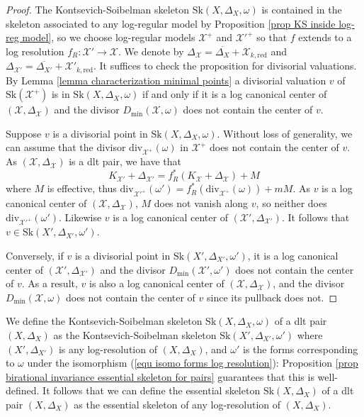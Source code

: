 \documentclass{amsart}%
\numberwithin{equation}{subsection}
\theoremstyle{plain2}
\theoremstyle{definition2}
\theoremstyle{stepstyle}
\theoremstyle{point}
\theoremstyle{subpoint}
\newcommand{\cX}{\ensuremath{\mathscr{X}}}
\newcommand{\redu}{\mathrm{red}}
\newcommand{\divisor}{\mathrm{div}}
\newcommand{\Sk}{\mathrm{Sk}}
\begin{document}
\begin{proof}
The Kontsevich-Soibelman skeleton $\Sk(X,\Delta_X,\omega)$ is contained in the skeleton associated to any log-regular model by Proposition \ref{prop KS inside log-reg model}, so we choose log-regular models $\cX^+$ and $\cX'^+$ so that $f$ extends to a log resolution $f_R \colon \cX' \to \cX$. We denote by $\Delta_\cX = \overline{\Delta_X} + \cX_{k,\redu}$ and $\Delta_{\cX'}=\overline{\Delta_{X'}} + \cX'_{k,\redu}$. It suffices to check the proposition for divisorial valuations. By Lemma \ref{lemma characterization minimal points} a divisorial valuation $v$ of $\Sk(\cX^+)$ is in $\Sk(X,\Delta_X,\omega)$ if and only if it is a log canonical center of $(\cX,\Delta_{\cX})$ and the divisor $D_{\min}(\cX,\omega)$ does not contain the center of $v$.  

Suppose $v$ is a divisorial point in $\Sk(X, \Delta_X,\omega)$. Without loss of generality, we can assume that the divisor $\divisor_{\cX^+}(\omega)$ in $\cX^+$ does not contain the center of $v$. As $(\cX, \Delta_\cX)$ is a dlt pair, we have that $$K_{\cX'}+\Delta_{\cX'}= f_R^*(K_{\cX}+\Delta_\cX)+M$$ where $M$ is effective, thus  $\divisor_{\cX'^+}(\omega')=f^*_R(\divisor_{\cX^+}(\omega))+mM$. As $v$ is a log canonical center of $(\cX,\Delta_\cX)$, $M$ does not vanish along $v$, so neither does $\divisor_{\cX'^+}(\omega')$. Likewise $v$ is a log canonical center of $(\cX', \Delta_{\cX'})$. It follows that $v \in \Sk(X',\Delta_{X'},\omega')$.

Conversely, if $v$ is a divisorial point in $\Sk(X', \Delta_{X'},\omega')$, it is a log canonical center of $(\cX', \Delta_{\cX'})$ and the divisor $D_{\min}(\cX',\omega')$ does not contain the center of $v$. As a result, $v$ is also a log canonical center of $(\cX, \Delta_\cX)$, and the divisor $D_{\min}(\cX,\omega)$ does not contain the center of $v$ since its pullback does not.
\end{proof}
We define the Kontsevich-Soibelman skeleton $\Sk(X,\Delta_X,\omega)$ of a dlt pair $(X, \Delta_X)$ as the Kontsevich-Soibelman skeleton $\Sk(X',\Delta_{X'},\omega')$ where $(X',\Delta_{X'})$ is any log-resolution of $(X,\Delta_X)$, and $\omega'$ is the forms corresponding to $\omega$ under the isomorphism (\ref{equ isomo forms log resolution}): Proposition \ref{prop birational invariance essential skeleton for pairs} guarantees that this is well-defined. It follows that we can define the essential skeleton $\Sk(X,\Delta_X)$ of a dlt pair $(X, \Delta_X)$ as the essential skeleton of any log-resolution of $(X,\Delta_X)$.
\end{document}
